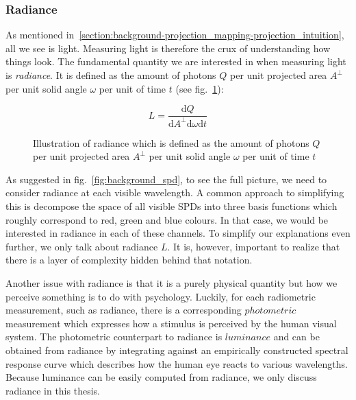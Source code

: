 \subsubsection{Radiance}
\label{section:background-projection_mapping-light_transport-radiance}

As mentioned in~\ref{section:background-projection_mapping-projection_intuition}, all we see is light. Measuring light is therefore the crux of understanding how things look. The fundamental quantity we are interested in when measuring light is \textit{radiance}. It is defined as the amount of photons \(Q\) per unit projected area \(A^\perp \) per unit solid angle \(\omega\) per unit of time \(t\) (see fig.~\ref{fig:background_radiance}):

\begin{equation}
    \label{eq:radiance}
    L = \frac{\mathrm{d}Q}{\mathrm{d}A^\perp \mathrm{d}\omega \mathrm{d}t}
\end{equation}

\begin{figure}
    \centering
    \def\svgwidth{0.5\textwidth}
    
    \caption{Illustration of radiance which is defined as the amount of photons \(Q\) per unit projected area \(A^\perp \) per unit solid angle \(\omega\) per unit of time \(t\)}
    \label{fig:background_radiance}
\end{figure}

As suggested in fig.~\ref{fig:background_spd}, to see the full picture, we need to consider radiance at each visible wavelength. A common approach to simplifying this is decompose the space of all visible SPDs into three basis functions which roughly correspond to red, green and blue colours. In that case, we would be interested in radiance in each of these channels. To simplify our explanations even further, we only talk about radiance \(L\). It is, however, important to realize that there is a layer of complexity hidden behind that notation.

Another issue with radiance is that it is a purely physical quantity but how we perceive something is to do with psychology. Luckily, for each radiometric measurement, such as radiance, there is a corresponding \(photometric\) measurement which expresses how a stimulus is perceived by the human visual system. The photometric counterpart to radiance is \(luminance\) and can be obtained from radiance by integrating against an empirically constructed spectral response curve which describes how the human eye reacts to various wavelengths. Because luminance can be easily computed from radiance, we only discuss radiance in this thesis.

